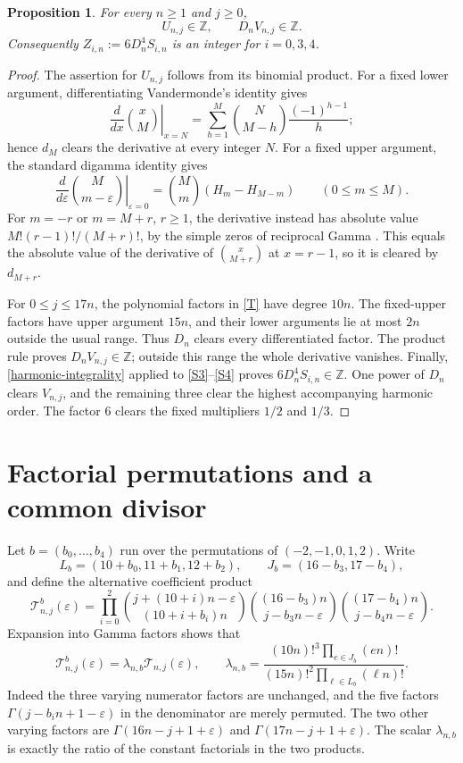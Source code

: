 \documentclass[11pt]{article}
\newcommand{\Z}{\mathbb Z}
\newtheorem{proposition}{Proposition}
\begin{document}
\begin{proposition}\label{integral}
For every $n\geq1$ and $j\geq0$,
\[
 U_{n,j}\in\Z,\qquad D_nV_{n,j}\in\Z.
\]
Consequently $Z_{i,n}:=6D_n^4S_{i,n}$ is an integer for $i=0,3,4$.
\end{proposition}
\begin{proof}
The assertion for $U_{n,j}$ follows from its binomial product.
For a fixed lower argument, differentiating Vandermonde's identity gives
\[
 \left.\frac{d}{dx}\binom{x}{M}\right|_{x=N}
 =\sum_{h=1}^{M}\binom{N}{M-h}\frac{(-1)^{h-1}}h;
\]
hence $d_M$ clears the derivative at every integer $N$.
For a fixed upper argument, the standard digamma identity gives
\[
 \left.\frac{d}{d\varepsilon}\binom{M}{m-\varepsilon}
 \right|_{\varepsilon=0}
 =\binom{M}{m}(H_m-H_{M-m})\qquad(0\leq m\leq M).
\]
For $m=-r$ or $m=M+r$, $r\geq1$, the derivative instead has absolute
value $M!(r-1)!/(M+r)!$, by the simple zeros of reciprocal Gamma
\cite[\S5.2]{DLMF}. This equals the absolute value of the derivative of
$\binom{x}{M+r}$ at $x=r-1$, so it is cleared by $d_{M+r}$.

For $0\leq j\leq17n$, the polynomial factors in \eqref{T} have degree
$10n$. The fixed-upper factors have upper argument $15n$, and their
lower arguments lie at most $2n$ outside the usual range. Thus $D_n$
clears every differentiated factor. The product rule proves
$D_nV_{n,j}\in\Z$; outside this range the whole derivative vanishes.
Finally, \eqref{harmonic-integrality} applied to \eqref{S3}--\eqref{S4}
proves $6D_n^4S_{i,n}\in\Z$. One power of $D_n$ clears $V_{n,j}$,
and the remaining three clear the highest accompanying harmonic order.
The factor $6$ clears the fixed multipliers $1/2$ and $1/3$.
\end{proof}

\section{Factorial permutations and a common divisor}
Let $b=(b_0,\ldots,b_4)$ run over the permutations of $(-2,-1,0,1,2)$.
Write
\[
 L_b=(10+b_0,11+b_1,12+b_2),\qquad
 J_b=(16-b_3,17-b_4),
\]
and define the alternative coefficient product
\[
 \mathcal T^b_{n,j}(\varepsilon)=
 \prod_{i=0}^2\binom{j+(10+i)n-\varepsilon}{(10+i+b_i)n}
 \binom{(16-b_3)n}{j-b_3n-\varepsilon}
 \binom{(17-b_4)n}{j-b_4n-\varepsilon}.
\]
Expansion into Gamma factors shows that
\begin{equation}\label{permutation}
 \mathcal T^b_{n,j}(\varepsilon)=\lambda_{n,b}\mathcal T_{n,j}(\varepsilon),
 \qquad
 \lambda_{n,b}=
 \frac{(10n)!^3\prod_{e\in J_b}(en)!}
 {(15n)!^2\prod_{\ell\in L_b}(\ell n)!}.
\end{equation}
Indeed the three varying numerator factors are unchanged, and the five
factors $\Gamma(j-b_i n+1-\varepsilon)$ in the denominator are merely
permuted. The two other varying factors are
$\Gamma(16n-j+1+\varepsilon)$ and
$\Gamma(17n-j+1+\varepsilon)$.
The scalar $\lambda_{n,b}$ is exactly the ratio of the constant
factorials in the two products.
\end{document}
